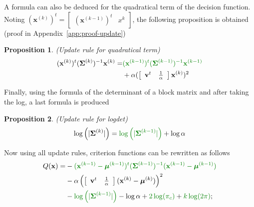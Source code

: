 \documentclass[journal,peerreview,onecolumn]{IEEEtran}
\newtheorem{prop}{Proposition}
\begin{document}
        A formula can also be deduced for the quadratical term of the decision function. Noting $(\mathbf{x}^{(k)})^t = \left[\begin{array}{cc} (\mathbf{x}^{(k-1)})^t   & x^k \end{array}\right]$, the following proposition is obtained (proof in Appendix~\ref{app:proof-update})
        \begin{prop}
        \label{eq:update-quad}
            (Update rule for quadratical term)
            \begin{align*}
                (\mathbf{x}^{(k)})^t (\boldsymbol{\Sigma}^{(k)})^{-1} \mathbf{x}^{(k)} = &\textcolor[rgb]{0,0.5,0}{(\mathbf{x}^{(k-1)})^t (\boldsymbol{\Sigma}^{(k-1)})^{-1} \mathbf{x}^{(k-1)}} \\
                &+ \alpha ( \left[\begin{array}{cc} \mathbf{v}^t & \frac{1}{\alpha} \end{array}\right] \mathbf{x}^{(k)} )^2
            \end{align*}
        \end{prop}

        Finally, using the formula of the determinant of a block matrix and after taking the log, a last formula is produced
        \begin{prop}
        \label{eq:update-log}
            (Update rule for logdet)
            \begin{equation*}
                \log \left(|\boldsymbol{\Sigma}^{(k)}|\right) = \textcolor[rgb]{0,0.5,0}{\log \left(|\boldsymbol{\Sigma}^{(k-1)}|\right)} + \log \alpha
            \end{equation*}
        \end{prop}

        Now using all update rules, criterion functions can be rewritten as follows
        \begin{align}
        \label{eq:q-update}
            Q(\mathbf{x}) = &- \textcolor[rgb]{0,0.5,0}{(\mathbf{x}^{(k-1)} - \boldsymbol{\mu}^{(k-1)})^t (\boldsymbol{\Sigma}^{(k-1)})^{-1} (\mathbf{x}^{(k-1)} - \boldsymbol{\mu}^{(k-1)})} \nonumber \\
            &- \alpha \left( \left[\begin{array}{cc} \mathbf{v}^t & \frac{1}{\alpha} \end{array}\right] (\mathbf{x}^{(k)} - \boldsymbol{\mu}^{(k)}) \right)^2 \nonumber \\
            &- \textcolor[rgb]{0,0.5,0}{\log \left(|\boldsymbol{\Sigma}^{(k-1)}|\right)} - \log \alpha  + \textcolor[rgb]{0,0.5,0}{2 \log (\pi_c)} + \textcolor[rgb]{0,0.5,0}{k \log(2 \pi)};
        \end{align}
\end{document}
